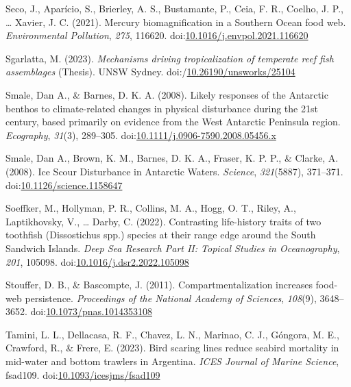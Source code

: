 \documentclass[
]{article}
\newlength{\cslhangindent}
\newenvironment{CSLReferences}[2] %
 {\begin{list}{}{%
  \setlength{\itemindent}{0pt}
  \setlength{\leftmargin}{0pt}
  \setlength{\parsep}{0pt}
  \ifodd #1
   \setlength{\leftmargin}{\cslhangindent}
   \setlength{\itemindent}{-1\cslhangindent}
  \fi
  \setlength{\itemsep}{#2\baselineskip}}}
 {\end{list}}
\begin{document}
\begin{CSLReferences}{1}{0}
Seco, J., Aparício, S., Brierley, A. S., Bustamante, P., Ceia, F. R.,
Coelho, J. P., \ldots{} Xavier, J. C. (2021). Mercury biomagnification
in a {Southern Ocean} food web. \emph{Environmental Pollution},
\emph{275}, 116620.
doi:\href{https://doi.org/10.1016/j.envpol.2021.116620}{10.1016/j.envpol.2021.116620}

Sgarlatta, M. (2023). \emph{Mechanisms driving tropicalization of
temperate reef fish assemblages} (Thesis). UNSW Sydney.
doi:/\href{https://doi.org/10.26190/unsworks/25104}{10.26190/unsworks/25104}

Smale, Dan A., \& Barnes, D. K. A. (2008). Likely responses of the
{Antarctic} benthos to climate-related changes in physical disturbance
during the 21st century, based primarily on evidence from the {West
Antarctic Peninsula} region. \emph{Ecography}, \emph{31}(3), 289--305.
doi:\href{https://doi.org/10.1111/j.0906-7590.2008.05456.x}{10.1111/j.0906-7590.2008.05456.x}

Smale, Dan A., Brown, K. M., Barnes, D. K. A., Fraser, K. P. P., \&
Clarke, A. (2008). Ice {Scour Disturbance} in {Antarctic Waters}.
\emph{Science}, \emph{321}(5887), 371--371.
doi:\href{https://doi.org/10.1126/science.1158647}{10.1126/science.1158647}

Soeffker, M., Hollyman, P. R., Collins, M. A., Hogg, O. T., Riley, A.,
Laptikhovsky, V., \ldots{} Darby, C. (2022). Contrasting life-history
traits of two toothfish ({Dissostichus} spp.) species at their range
edge around the {South Sandwich Islands}. \emph{Deep Sea Research Part
II: Topical Studies in Oceanography}, \emph{201}, 105098.
doi:\href{https://doi.org/10.1016/j.dsr2.2022.105098}{10.1016/j.dsr2.2022.105098}

Stouffer, D. B., \& Bascompte, J. (2011). Compartmentalization increases
food-web persistence. \emph{Proceedings of the National Academy of
Sciences}, \emph{108}(9), 3648--3652.
doi:\href{https://doi.org/10.1073/pnas.1014353108}{10.1073/pnas.1014353108}

Tamini, L. L., Dellacasa, R. F., Chavez, L. N., Marinao, C. J., Góngora,
M. E., Crawford, R., \& Frere, E. (2023). Bird scaring lines reduce
seabird mortality in mid-water and bottom trawlers in {Argentina}.
\emph{ICES Journal of Marine Science}, fsad109.
doi:\href{https://doi.org/10.1093/icesjms/fsad109}{10.1093/icesjms/fsad109}


\end{CSLReferences}
\end{document}
